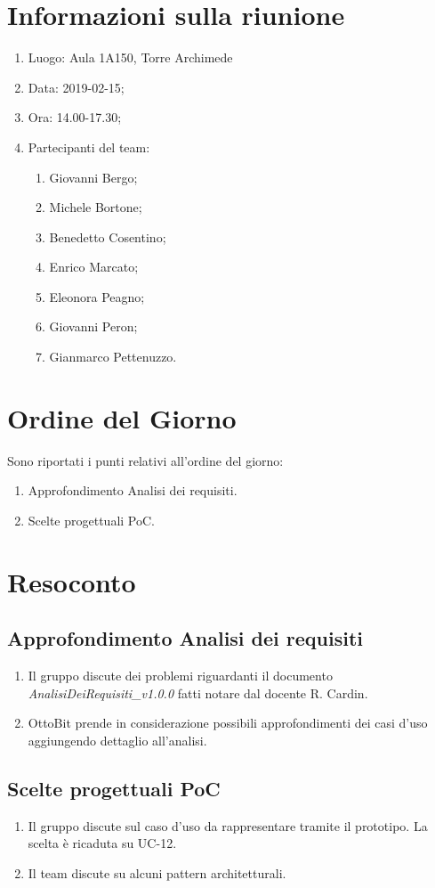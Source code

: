 \documentclass[11pt,a4paper]{article}
\begin{document}
	\section{Informazioni sulla riunione}
	\begin{enumerate}
		\item Luogo: Aula 1A150, Torre Archimede
		\item Data: 2019-02-15;
		\item Ora: 14.00-17.30;
		\item Partecipanti del team:
			\begin{enumerate}
				\item Giovanni Bergo;
				\item Michele Bortone;
				\item Benedetto Cosentino;
				\item Enrico Marcato;
				\item Eleonora Peagno;
				\item Giovanni Peron;
				\item Gianmarco Pettenuzzo.
			\end{enumerate}
	\end{enumerate}
	
	\section{Ordine del Giorno}
	Sono riportati i punti relativi all'ordine del giorno:
	\begin{enumerate}
		\item Approfondimento Analisi dei requisiti.
		\item Scelte progettuali PoC.
	\end{enumerate}
	
	\section{Resoconto}
		\subsection{Approfondimento Analisi dei requisiti}
	\begin{enumerate}
		\item Il gruppo discute dei problemi riguardanti il documento \textit{AnalisiDeiRequisiti\_v1.0.0} fatti notare dal docente R. Cardin.
		\item OttoBit prende in considerazione possibili approfondimenti dei casi d'uso aggiungendo dettaglio all'analisi.
		
	\end{enumerate}
	\subsection{Scelte progettuali PoC}
	\begin{enumerate}
		\item Il gruppo discute sul caso d'uso da rappresentare tramite il prototipo. La scelta è ricaduta su UC-12.
		\item Il team discute su alcuni pattern architetturali.
	\end{enumerate}
\end{document}
